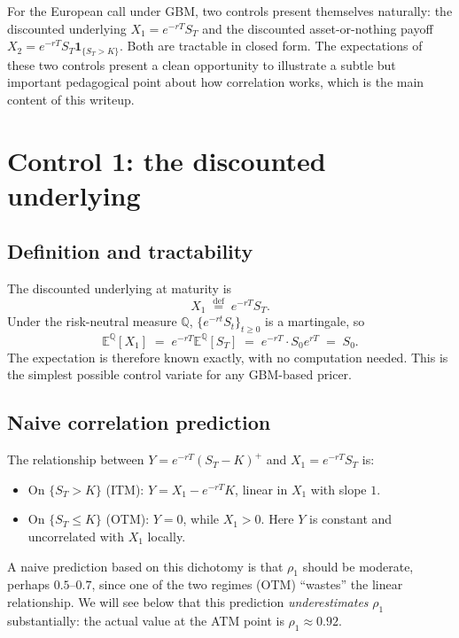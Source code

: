 \documentclass[11pt,a4paper]{article}
\theoremstyle{plain}
\theoremstyle{definition}
\theoremstyle{remark}
\newcommand{\E}{\mathbb{E}}
\newcommand{\Q}{\mathbb{Q}}
\newcommand{\eqdef}{\overset{\mathrm{def}}{=}}
\newcommand{\indic}{\mathbf{1}}
\begin{document}
For the European call under GBM, two controls present themselves
naturally: the discounted underlying $X_1 = e^{-rT} S_T$ and the
discounted asset-or-nothing payoff $X_2 = e^{-rT} S_T
\indic_{\{S_T>K\}}$. Both are tractable in closed form. The
expectations of these two controls present a clean opportunity to
illustrate a subtle but important pedagogical point about how
correlation works, which is the main content of this writeup.

\section{Control 1: the discounted underlying}
\label{sec:cv-underlying}

\subsection{Definition and tractability}

The discounted underlying at maturity is
\begin{equation}
X_1 \;\eqdef\; e^{-rT} S_T.
\end{equation}
Under the risk-neutral measure $\Q$, $\{e^{-rt} S_t\}_{t \geq 0}$ is
a martingale, so
\begin{equation}
\E^\Q[X_1] \;=\; e^{-rT} \E^\Q[S_T] \;=\; e^{-rT} \cdot S_0 e^{rT}
\;=\; S_0.
\end{equation}
The expectation is therefore known exactly, with no computation
needed. This is the simplest possible control variate for any
GBM-based pricer.

\subsection{Naive correlation prediction}

The relationship between $Y = e^{-rT} (S_T - K)^+$ and $X_1 = e^{-rT}
S_T$ is:
\begin{itemize}
\item On $\{S_T > K\}$ (ITM): $Y = X_1 - e^{-rT} K$, linear in $X_1$
with slope $1$.
\item On $\{S_T \leq K\}$ (OTM): $Y = 0$, while $X_1 > 0$. Here $Y$
is constant and uncorrelated with $X_1$ locally.
\end{itemize}
A naive prediction based on this dichotomy is that $\rho_1$ should
be moderate, perhaps $0.5$--$0.7$, since one of the two regimes (OTM)
``wastes'' the linear relationship. We will see below that this
prediction \emph{underestimates} $\rho_1$ substantially: the actual
value at the ATM point is $\rho_1 \approx 0.92$.
\end{document}
